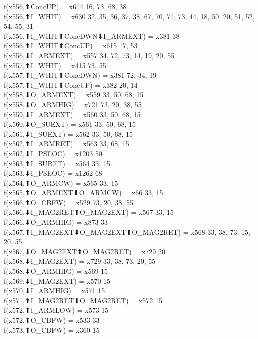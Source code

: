 f(x556,⬆ConcUP) = x614 {16, 73, 68, 38} \\
f(x556,⬆I_WHIT) = x630 {32, 35, 36, 37, 38, 67, 70, 71, 73, 44, 18, 50, 20, 51, 52, 54, 55, 31} \\
f(x556,⬆I_WHIT⬆ConcDWN⬇I_ARMEXT) = x381 {38} \\
f(x556,⬆I_WHIT⬆ConcUP) = x615 {17, 53} \\
f(x556,⬇I_ARMEXT) = x557 {34, 72, 73, 14, 19, 20, 55} \\
f(x557,⬆I_WHIT) = x415 {73, 55} \\
f(x557,⬆I_WHIT⬆ConcDWN) = x381 {72, 34, 19} \\
f(x557,⬆I_WHIT⬆ConcUP) = x382 {20, 14} \\
f(x558,⬇O_ARMEXT) = x559 {33, 50, 68, 15} \\
f(x558,⬇O_ARMHIG) = x721 {73, 20, 38, 55} \\
f(x559,⬇I_ARMEXT) = x560 {33, 50, 68, 15} \\
f(x560,⬇O_SUEXT) = x561 {33, 50, 68, 15} \\
f(x561,⬇I_SUEXT) = x562 {33, 50, 68, 15} \\
f(x562,⬆I_ARMRET) = x563 {33, 68, 15} \\
f(x562,⬇I_PSEOC) = x1203 {50} \\
f(x563,⬆I_SURET) = x564 {33, 15} \\
f(x563,⬇I_PSEOC) = x1262 {68} \\
f(x564,⬆O_ARMCW) = x565 {33, 15} \\
f(x565,⬆O_ARMEXT⬇O_ARMCW) = x66 {33, 15} \\
f(x566,⬆O_CBFW) = x529 {73, 20, 38, 55} \\
f(x566,⬇I_MAG2RET⬆O_MAG2EXT) = x567 {33, 15} \\
f(x566,⬇O_ARMHIG) = x873 {33} \\
f(x567,⬆I_MAG2EXT⬇O_MAG2EXT⬆O_MAG2RET) = x568 {33, 38, 73, 15, 20, 55} \\
f(x567,⬇O_MAG2EXT⬆O_MAG2RET) = x729 {20} \\
f(x568,⬇I_MAG2EXT) = x729 {33, 38, 73, 20, 55} \\
f(x568,⬇O_ARMHIG) = x569 {15} \\
f(x569,⬇I_MAG2EXT) = x570 {15} \\
f(x570,⬇I_ARMHIG) = x571 {15} \\
f(x571,⬆I_MAG2RET⬇O_MAG2RET) = x572 {15} \\
f(x572,⬆I_ARMLOW) = x573 {15} \\
f(x572,⬆O_CBFW) = x533 {33} \\
f(x573,⬆O_CBFW) = x360 {15} \\
